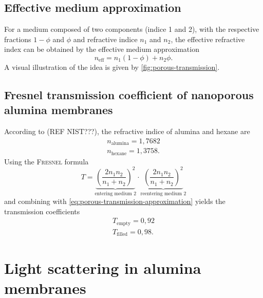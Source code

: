\documentclass[../thesis.tex]{subfiles}
\begin{document}
      \subsection{Effective medium approximation}
      \label{subsec:effective-medium-approx}

        For a medium composed of two components (indice 1 and 2), with the respective fractions $1-\phi$ and $\phi$ and refractive indice $n_1$ and $n_2$, the effective refractive index can be obtained by the effective medium approximation
        \begin{equation}
          n_\mathrm{eff} = n_1 \left(1-\phi\right) + n_2 \phi.
          \label{eq:porous-transmission-approximation}
        \end{equation}
        A visual illustration of the idea is given by \cref{fig:porous-transmission}.

        


      \subsection{Fresnel transmission coefficient of nanoporous alumina membranes}

        According to (REF NIST???), the refractive indice of alumina and hexane are
        \begin{align*}
          n_\mathrm{alumina}=1,7682  \\%
          n_\mathrm{hexane}=1,3758  . %
        \end{align*}
        Using the \textsc{Fresnel} formula
        \begin{equation*}
          T=\underbrace{\left(\frac{2n_1n_2}{n_1+n_2}\right) ^2}_{\text{entering medium 2}}\cdot \underbrace{\left(\frac{2n_1n_2}{n_1+n_2}\right) ^2}_{\text{reentering medium 2}}
        \end{equation*}
        and combining with \cref{eq:porous-transmission-approximation} yields the transmission coefficients
        \begin{align}
          T_\mathrm{empty}=0,92 \\
          T_\mathrm{filled}=0,98  .
          \label{eq:trans-coeffs}
        \end{align}
        

      \section{Light scattering in alumina membranes}
      \label{sec:scattering-in-alumina-membranes}
\end{document}
